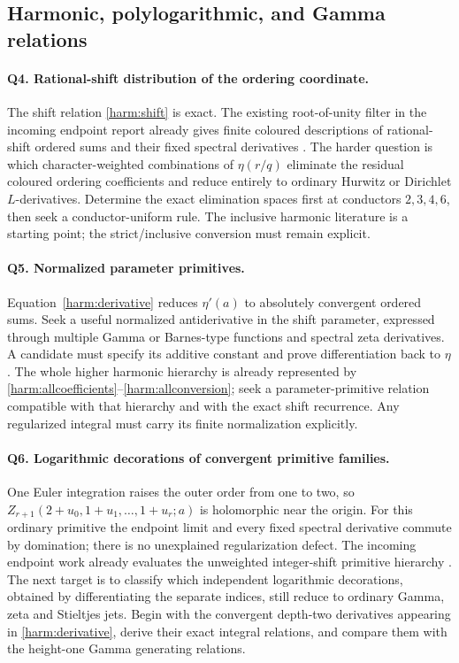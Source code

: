 \subsection{Harmonic, polylogarithmic, and Gamma relations}

\paragraph{Q4. Rational-shift distribution of the ordering coordinate.}
The shift relation \eqref{harm:shift} is exact. The existing
root-of-unity filter in the incoming endpoint report already gives
finite coloured descriptions of rational-shift ordered sums and
their fixed spectral derivatives \cite{repoendpoint}. The harder
question is which character-weighted combinations of $\eta(r/q)$
eliminate the residual coloured ordering coefficients and reduce
entirely to ordinary Hurwitz or Dirichlet $L$-derivatives. Determine
the exact elimination spaces first at conductors $2,3,4,6$, then
seek a conductor-uniform rule. The inclusive harmonic literature
\cite{Kargin} is a starting point; the strict/inclusive conversion
must remain explicit.

\paragraph{Q5. Normalized parameter primitives.}
Equation~\eqref{harm:derivative} reduces $\eta'(a)$ to absolutely
convergent ordered sums. Seek a useful normalized antiderivative in
the shift parameter, expressed through multiple Gamma or Barnes-type
functions and spectral zeta derivatives. A candidate must specify
its additive constant and prove differentiation back to $\eta$.
The whole higher harmonic hierarchy is already represented by
\eqref{harm:allcoefficients}--\eqref{harm:allconversion}; seek a
parameter-primitive relation compatible with that hierarchy and with
the exact shift recurrence. Any regularized integral must carry its
finite normalization explicitly.

\paragraph{Q6. Logarithmic decorations of convergent primitive families.}
One Euler integration raises the outer order from one to two, so
$Z_{r+1}(2+u_0,1+u_1,\ldots,1+u_r;a)$ is holomorphic near the origin.
For this ordinary primitive the endpoint limit and every fixed
spectral derivative commute by domination; there is no unexplained
regularization defect. The incoming endpoint work already evaluates
the unweighted integer-shift primitive hierarchy
\cite{repoendpoint}. The next target is to classify which independent
logarithmic decorations, obtained by differentiating the separate
indices, still reduce to ordinary Gamma, zeta and Stieltjes jets.
Begin with the convergent depth-two derivatives appearing in
\eqref{harm:derivative}, derive their exact integral relations, and
compare them with the height-one Gamma generating relations.

